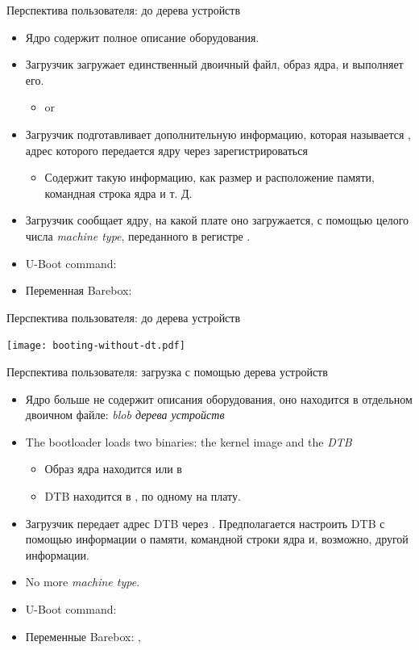 \documentclass[obeyspaces,spaces,hyphens]{beamer}
\begin{document}
\begin{frame}{Перспектива пользователя: до дерева устройств}
  \begin{itemize}
  \item Ядро содержит полное описание оборудования.
  \item Загрузчик загружает единственный двоичный файл, образ ядра, и выполняет его.
    \begin{itemize}
    \item {} or 
    \end{itemize}
  \item Загрузчик подготавливает дополнительную информацию, которая называется
     , адрес которого передается ядру через
     зарегистрироваться 
    \begin{itemize}
    \item Содержит такую информацию, как размер и расположение памяти, командная строка ядра и т. Д.
    \end{itemize}
  \item Загрузчик сообщает ядру, на какой плате оно загружается, с помощью целого числа {\em machine type}, переданного в регистре
    .
  \item U-Boot command: 
  \item Переменная Barebox: 
  \end{itemize}
\end{frame}

\begin{frame}{Перспектива пользователя: до дерева устройств}
  \begin{center}
    \texttt{[image: booting-without-dt.pdf]}
  \end{center}
\end{frame}

\begin{frame}{Перспектива пользователя: загрузка с помощью дерева устройств}
  \begin{itemize}
  \item Ядро больше не содержит описания оборудования, оно находится в отдельном двоичном файле: {\em blob дерева устройств}
  \item The bootloader loads two binaries: the kernel image and the
    {\em DTB}
    \begin{itemize}
    \item Образ ядра находится  или в 
    \item DTB находится в , по одному на плату.
    \end{itemize}
  \item Загрузчик передает адрес DTB через . Предполагается настроить DTB с помощью информации о памяти, командной строки ядра и, возможно, другой информации.
  \item No more {\em machine type}.
  \item U-Boot command: 
  \item Переменные Barebox: , 
  \end{itemize}
\end{frame}
\end{document}
